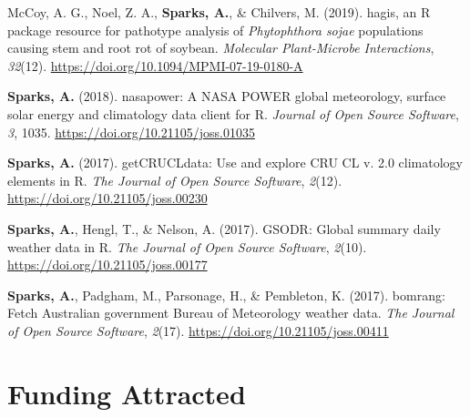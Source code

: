 \documentclass[11pt, a4paper]{awesome-cv}
\begin{document}
\hypertarget{refs_Rpackages}{}
\leavevmode\hypertarget{ref-mccoy2019hagis}{}%
McCoy, A. G., Noel, Z. A., \textbf{Sparks, A.}, \& Chilvers, M. (2019). hagis, an R package resource for pathotype analysis of \emph{Phytophthora sojae} populations causing stem and root rot of soybean. \emph{Molecular Plant-Microbe Interactions}, \emph{32}(12). \url{https://doi.org/10.1094/MPMI-07-19-0180-A}

\leavevmode\hypertarget{ref-Sparks2018}{}%
\textbf{Sparks, A.} (2018). nasapower: A NASA POWER global meteorology, surface solar energy and climatology data client for R. \emph{Journal of Open Source Software}, \emph{3}, 1035. \url{https://doi.org/10.21105/joss.01035}

\leavevmode\hypertarget{ref-Sparks2017c}{}%
\textbf{Sparks, A.} (2017). getCRUCLdata: Use and explore CRU CL v. 2.0 climatology elements in R. \emph{The Journal of Open Source Software}, \emph{2}(12). \url{https://doi.org/10.21105/joss.00230}

\leavevmode\hypertarget{ref-Sparks2017}{}%
\textbf{Sparks, A.}, Hengl, T., \& Nelson, A. (2017). GSODR: Global summary daily weather data in R. \emph{The Journal of Open Source Software}, \emph{2}(10). \url{https://doi.org/10.21105/joss.00177}

\leavevmode\hypertarget{ref-Sparks2017a}{}%
\textbf{Sparks, A.}, Padgham, M., Parsonage, H., \& Pembleton, K. (2017). bomrang: Fetch Australian government Bureau of Meteorology weather data. \emph{The Journal of Open Source Software}, \emph{2}(17). \url{https://doi.org/10.21105/joss.00411}

\endgroup

\hypertarget{funding-attracted}{%
\section{Funding Attracted}\label{funding-attracted}}
\end{document}
